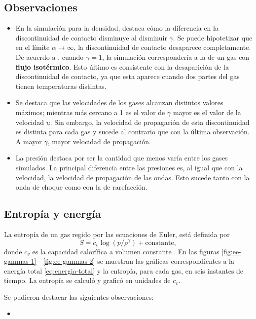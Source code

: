 \subsection{Observaciones}
\begin{itemize}
	\item En la simulación para la densidad, destaca cómo la diferencia en la discontinuidad de contacto disminuye al disminuir $\gamma$. Se puede hipotetizar que en el límite $\alpha \rightarrow \infty$, la discontinuidad de contacto desaparece completamente. De acuerdo a \cite{LeVeque}, cuando $\gamma = 1$, la simulación correspondería a la de un gas con \textbf{flujo isotérmico}. Esto último es consistente con la desaparición de la discontinuidad de contacto, ya que esta aparece cuando dos partes del gas tienen temperaturas distintas.
	\item Se destaca que las velocidades de los gases alcanzan distintos valores máximos; mientras más cercano a 1 es el valor de $\gamma$ mayor es el valor de la velocidad $u$. Sin embargo, la velocidad de propagación de esta discontinuidad es distinta para cada gas y sucede al contrario que con la última observación. A mayor $\gamma$, mayor velocidad de propagación.
	\item La presión destaca por ser la cantidad que menos varía entre los gases simulados. La principal diferencia entre las presiones es, al igual que con la velocidad, la velocidad de propagación de las ondas. Esto sucede tanto con la onda de choque como con la de rarefacción.
\end{itemize}

\subsection{Entropía y energía}
La entropía de un gas regido por las ecuaciones de Euler, está definida por
\begin{equation}
	S = c_{v}\log(p/\rho^{\gamma}) + \text{constante},
\end{equation}
donde $c_v$ es la capacidad calorífica a volumen constante \cite{LeVeque}. En las figuras \ref{fig:ee-gammas-1} - \ref{fig:ee-gammas-2} se muestran las gráficas correspondientes a la energía total \eqref{eq:energia-total} y la entropía, para cada gas, en seis instantes de tiempo. La entropía se calculó y graficó en unidades de $c_v$.

Se pudieron destacar las siguientes observaciones:
\begin{itemize}
	\item 
\end{itemize}

